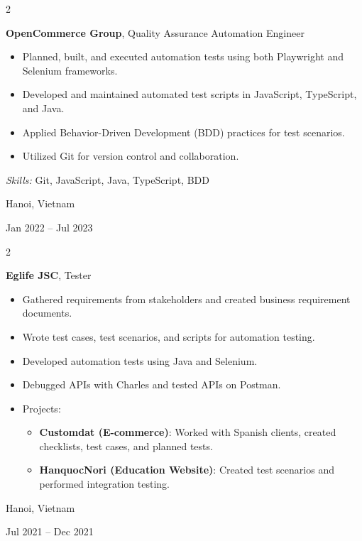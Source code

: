 \documentclass[10pt, letterpaper]{article}
\newenvironment{highlights}{
    \begin{itemize}[
        topsep=0.10 cm,
        parsep=0.10 cm,
        partopsep=0pt,
        itemsep=0pt,
        leftmargin=0.4 cm + 10pt
    ]
    }{
    \end{itemize}
} %
\newenvironment{twocolentry}[2][]{
    \onecolentry
    \def\secondColumn{#2}
    \setcolumnwidth{\fill, 4.5 cm}
    \begin{paracol}{2}
    }{
        \switchcolumn \raggedleft \secondColumn
    \end{paracol}
    \endonecolentry
} %
\begin{document}
    \begin{twocolentry}{
        Hanoi, Vietnam

        Jan 2022 -- Jul 2023
    }
        \textbf{OpenCommerce Group}, Quality Assurance Automation Engineer
        \begin{highlights}
            \item Planned, built, and executed automation tests using both Playwright and Selenium frameworks.
            \item Developed and maintained automated test scripts in JavaScript, TypeScript, and Java.
            \item Applied Behavior-Driven Development (BDD) practices for test scenarios.
            \item Utilized Git for version control and collaboration.
        \end{highlights}
        \textit{Skills:} Git, JavaScript, Java, TypeScript, BDD
    \end{twocolentry}

    \vspace{0.2 cm}

    \begin{twocolentry}{
        Hanoi, Vietnam

        Jul 2021 -- Dec 2021
    }
        \textbf{Eglife JSC}, Tester
        \begin{highlights}
            \item Gathered requirements from stakeholders and created business requirement documents.
            \item Wrote test cases, test scenarios, and scripts for automation testing.
            \item Developed automation tests using Java and Selenium.
            \item Debugged APIs with Charles and tested APIs on Postman.
            \item Projects:
            \begin{itemize}
                \item \textbf{Customdat (E-commerce)}: Worked with Spanish clients, created checklists, test cases, and planned tests.
                \item \textbf{HanquocNori (Education Website)}: Created test scenarios and performed integration testing.
            \end{itemize}
        \end{highlights}
    \end{twocolentry}
\end{document}
